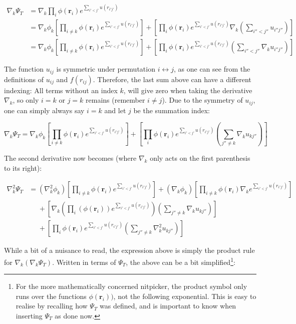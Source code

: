\documentclass[english, a4paper]{article}
\newcommand{\bm}[1]{\mathbf{#1}}
\begin{document}
\begin{align}
	\nabla_k\Psi_T &= \nabla_k\prod_i \phi(\bm{r}_i)e^{\sum_{i'<j'}u(r_{i'j'})}\\
	&= \nabla_k\phi_k\left[\prod_{i\neq k} \phi(\bm{r}_i)e^{\sum_{i'<j'}u(r_{i'j'})}\right] + \left[\prod_i \phi(\bm{r}_i)e^{\sum_{i'<j'}u(r_{i'j'})}\nabla_k\left(\sum_{i''<j''}u_{i''j''} \right)\right]\\
	&= \nabla_k\phi_k\left[\prod_{i\neq k} \phi(\bm{r}_i)e^{\sum_{i'<j'}u(r_{i'j'})}\right] + \left[\prod_i \phi(\bm{r}_i)e^{\sum_{i'<j'}u(r_{i'j'})}\left(\sum_{i''<j''}\nabla_ku_{i''j''} \right)\right]
\end{align}

The function $u_{ij}$ is symmetric under permutation $i \leftrightarrow j$, as one can see from the definitions of $u_{ij}$ and $f(r_{ij})$. Therefore, the last sum above can have a different indexing: All terms without an index $k$, will give zero when taking the derivative $\nabla_k$, so only $i=k$ or $j=k$ remains (remember $i \neq j$). Due to the symmetry of $u_{ij}$, one can simply always say $i=k$ and let $j$ be the summation index:

\begin{equation}
	\nabla_k\Psi_T = \nabla_k\phi_k\left[\prod_{i\neq k} \phi(\bm{r}_i)e^{\sum_{i'<j'}u(r_{i'j'})}\right] + \left[\prod_i \phi(\bm{r}_i)e^{\sum_{i'<j'}u(r_{i'j'})}\left(\sum_{j''\neq k}\nabla_ku_{kj''} \right)\right]
	\label{eq:grad}
\end{equation}

The second derivative now becomes (where $\nabla_k$ only acts on the first parenthesis to its right):

\begin{align*}
	\nabla_k^2\Psi_T &= (\nabla_k^2\phi_k)\left[\prod_{i\neq k} \phi(\bm{r}_i)e^{\sum_{i'<j'}u(r_{i'j'})}\right] + (\nabla_k\phi_k) \left[\prod_{i\neq k}\phi(\bm{r}_i)\nabla_ke^{\sum_{i'<j'}u(r_{i'j'})}\right]\\
	&\:\:\:\:\:\: + \left[\nabla_k\left(\prod_i \left(\phi(\bm{r}_i)\right)e^{\sum_{i'<j'}u(r_{i'j'})}\right)\left(\sum_{j''\neq k}\nabla_ku_{kj''} \right)\right]\\
	&\:\:\:\:\:\: + \left[\prod_i \phi(\bm{r}_i)e^{\sum_{i'<j'}u(r_{i'j'})}\left(\sum_{j''\neq k}\nabla_k^2u_{kj''} \right)\right]
\end{align*}

While a bit of a nuisance to read, the expression above is simply the product rule for $\nabla_k(\nabla_k\Psi_T)$. Written in terms of $\Psi_T$, the above can be a bit simplified\footnote{For the more mathematically concerned nitpicker, the product symbol only runs over the functions $\phi(\bm{r}_i))$, not the following exponential. This is easy to realise by recalling how $\Psi_T$ was defined, and is important to know when inserting $\Psi_T$ as done now.}:
\end{document}
